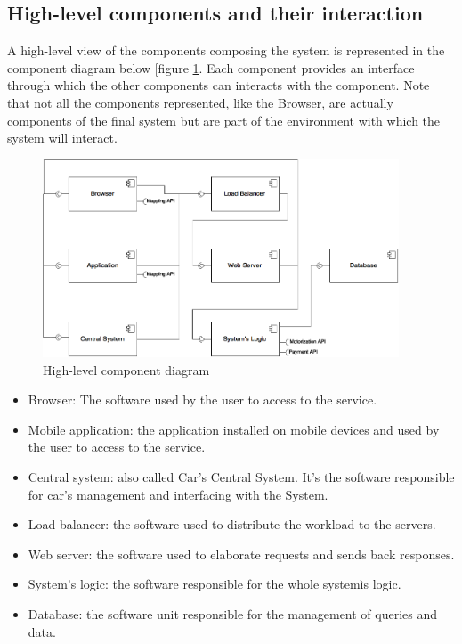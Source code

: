 \subsection{High-level components and their interaction}

A high-level view of the components composing the system is represented in the component diagram below [figure \ref{fig:high-lev-comp-diag}.
Each component provides an interface through which the other components can interacts with the component.
Note that not all the components represented, like the Browser, are actually components of the final system but are part of the environment with which the system will interact.

\begin{figure}[h]
	\centerline{
		\includegraphics[width=400px]{../Datas/images/high-level-component-diagram.png}
	}
	\caption{High-level component diagram}
	\label{fig:high-lev-comp-diag}
\end{figure}

\begin{itemize}
	\item Browser: The software used by the user to access to the service.
	\item Mobile application: the application installed on mobile devices and used by the user to access to the service.
	\item Central system: also called Car's Central System. It's the software responsible for car's management and interfacing with the System.
	\item Load balancer: the software used to distribute the workload to the servers.
	\item Web server: the software used to elaborate requests and sends back responses.
	\item System's logic: the software responsible for the whole systemìs logic.
	\item Database: the software unit responsible for the management of queries and data.
\end{itemize}
